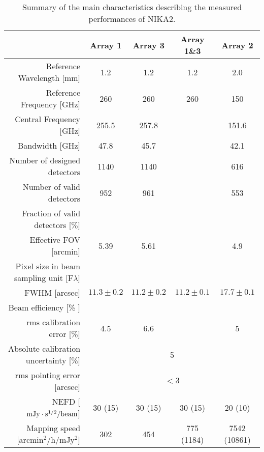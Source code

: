 

\begin{table}[h]
  \caption{Summary of the main characteristics describing the measured performances of NIKA2.}
  \label{nika2specs}
  \begin{threeparttable}
    \begin{tabular}{|r|c|c|c|c|}
      \hline
      & Array 1 & Array 3  & Array 1\&3 & Array 2 \\
      \hline
      \hline
      Reference Wavelength  [mm]  &  1.2   &  1.2  & 1.2 & 2.0  \\
      Reference Frequency  [GHz]  &  260   &  260  & 260 & 150  \\
      Central Frequency [GHz]     &  255.5  &    257.8     &     &   151.6      \\
      Bandwidth         [GHz]     &   47.8  &     45.7     &     &    42.1      \\
      \hline
      Number of designed detectors       & 1140      &  1140    &    &    616      \\
      Number of valid detectors          &  952      &   961    &    &    553      \\
      Fraction of valid detectors [$\%$] &           &          &    &             \\
      Effective FOV\tnote{a}\hspace{1mm} [arcmin]    &   5.39    &   5.61    &    &   4.9      \\
      \hline
      Pixel size in beam sampling unit [F$\lambda$]  &    &   &    &   \\
      \hline
      FWHM\tnote{b}\hspace{1mm} [arcsec]  &  $11.3 \pm 0.2$   &  $11.2 \pm 0.2$  &   $11.2 \pm 0.1$  &  $17.7 \pm 0.1$   \\
      Beam efficiency\tnote{c}\hspace{1mm} [\% ]    &        &    &     &      \\
      \hline 
      rms calibration error [\%]            & 4.5  & 6.6  &   & 5 \\
      \hline
      Absolute calibration uncertainty [\%] &  \multicolumn{4}{|c|}{5} \\
      \hline
      rms pointing error    [arcsec]    & \multicolumn{4}{|c|}{$<3$} \\
      \hline
      NEFD\tnote{d}\hspace{1mm}   [$\rm{mJy} \cdot \rm{s}^{1/2}/\rm{beam}$]  &  30 (15)   & 30 (15)  &  30 (15)  & 20 (10) \\
      Mapping speed\tnote{e}\hspace{1mm} [arcmin$^2$/h/mJy$^2$] & 302  & 454  & 775 (1184)  & 7542 (10861) \\
\hline


\end{tabular}
\end{threeparttable}
\end{table}
